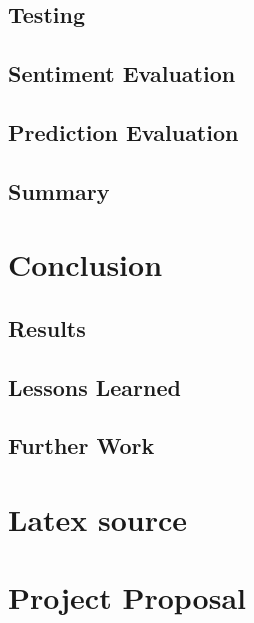 \documentclass[12pt,a4paper,twoside,openright]{report}
\begin{document}
\section{Testing}

\section{Sentiment Evaluation}

\section{Prediction Evaluation}

\section{Summary}

\chapter{Conclusion}

\section{Results}

\section{Lessons Learned}

\section{Further Work}

 



\appendix

\chapter{Latex source}


\chapter{Project Proposal}
\end{document}
